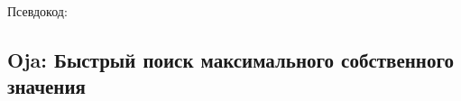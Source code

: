 \documentclass[12pt]{article}
\begin{document}
\newpage
 
Псевдокод:


\subsection{Oja: Быстрый поиск максимального собственного значения}






 
  
\end{document}
